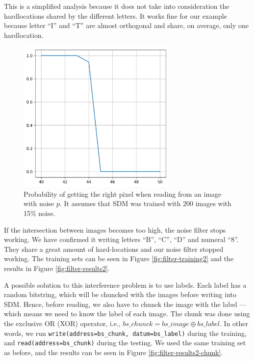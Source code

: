 This is a simplified analysis because it does not take into consideration the hardlocations shared by the different letters. It works fine for our example because letter ``I'' and ``T'' are almost orthogonal and share, on average, only one hardlocation.

\begin{figure}[!htb]
\centering\includegraphics[width=0.7\textwidth]{./images02/filter/prob-right-pixel.png}
\caption{Probability of getting the right pixel when reading from an image with noise $p$. It assumes that SDM was trained with 200 images with 15\% noise.
\label{fig:filter-prob-right-pixel}
}
\end{figure}

If the intersection between images becomes too high, the noise filter stops working. We have confirmed it writing letters ``B'', ``C'', ``D'' and numeral ``8''. They share a great amount of hard-locations and our noise filter stopped working. The training sets can be seen in Figure \ref{fig:filter-training2} and the results in Figure \ref{fig:filter-results2}.

A possible solution to this interference problem is to use labels. Each label has a random bitstring, which will be chuncked with the images before writing into SDM. Hence, before reading, we also have to chunck the image with the label --- which means we need to know the label of each image. The chunk was done using the exclusive OR (XOR) operator, i.e., $bs\_chunck = bs\_image \oplus bs\_label$. In other words, we run \lstinline{write(address=bs_chunk, datum=bs_label)} during the training, and \lstinline{read(address=bs_chunk)} during the testing. We used the same training set as before, and the results can be seen in Figure \ref{fig:filter-results2-chunk}.

